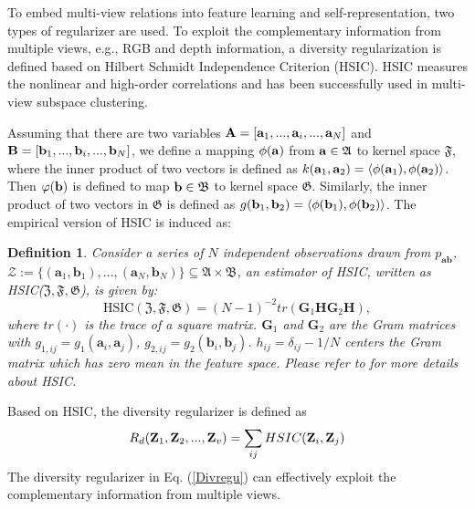 \documentclass[journal]{IEEEtran}
\newtheorem{myDef}{Definition}
\begin{document}
To embed multi-view relations into feature learning and self-representation, two types of regularizer are used.
To exploit the complementary information from multiple views, e.g., RGB and depth information, a diversity regularization is defined based on Hilbert Schmidt Independence Criterion (HSIC).
HSIC measures the nonlinear and high-order correlations and has been successfully used in multi-view subspace clustering.

Assuming that there are two variables ${\bf{A}} = \left[ {{{\bf{a}}_1},...,{{\bf{a}}_i},...,{{\bf{a}}_N}} \right]$ and ${\bf{B}} = \left[ {{{\bf{b}}_1},...,{{\bf{b}}_i},...,{{\bf{b}}_N}} \right]$,
we define a mapping $\phi ({\bf{a}})$ from ${\bf{a}} \in {\mathfrak{A}}$ to kernel space $\mathfrak{F}$, where the inner product of two vectors is defined as $k({{\bf{a}}_1},{{\bf{a}}_2}) = \left\langle {\phi ({{\bf{a}}_1}),\phi ({{\bf{a}}_2})} \right\rangle$.
Then $\varphi ({\bf{b}})$ is defined to map ${\bf{b}} \in {\mathfrak{B}}$ to kernel space $\mathfrak{G}$.
Similarly, the inner product of two vectors in $\mathfrak{G}$ is defined as $g({{\bf{b}}_1},{{\bf{b}}_2}) = \left\langle {\phi ({{\bf{b}}_1}),\phi ({{\bf{b}}_2})} \right\rangle$.
The empirical version of HSIC is induced as:
\begin{myDef}
Consider a series of $N$ independent observations drawn from $p_\mathbf{ab}$, $\mathcal{Z}:=\{(\mathbf{a}_1,\mathbf{b}_1),...,(\mathbf{a}_N,\mathbf{b}_N)\} \subseteq \mathfrak{A} \times \mathfrak{B}$, an estimator of HSIC, written as HSIC($\mathfrak{Z},\mathfrak{F},\mathfrak{G}$), is given by:
\begin{equation}{
\text{HSIC}(\mathfrak{Z},\mathfrak{F},\mathfrak{G}) =  (N-1)^{-2}tr(\mathbf{G}_1\mathbf{H}\mathbf{G}_2\mathbf{H}),
}
\end{equation}
where $tr(\cdot)$ is the trace of a square matrix. $\mathbf{G}_1$ and $\mathbf{G}_2$ are the Gram matrices with $g_{1,ij}=g_1(\mathbf{a}_i,\mathbf{a}_j)$, $g_{2,ij}=g_2(\mathbf{b}_i,\mathbf{b}_j)$. $h_{ij}=\delta_{ij}-1/N$ centers the Gram matrix which has zero mean in the feature space. Please refer to \cite{gretton2005measuring, Cao2015DiversityinducedMS} for more details about HSIC.
\end{myDef}
Based on HSIC, the diversity regularizer is defined as
\begin{equation}\label{Divregu}
  {R_d}({{\bf{Z}}_1},{{\bf{Z}}_2},...,{{\bf{Z}}_v}) = \sum\limits_{ij} {HSIC({{\bf{Z}}_i},{{\bf{Z}}_j})}
\end{equation}
The diversity regularizer in Eq. (\ref{Divregu}) can effectively exploit the complementary information from multiple views.
\end{document}
